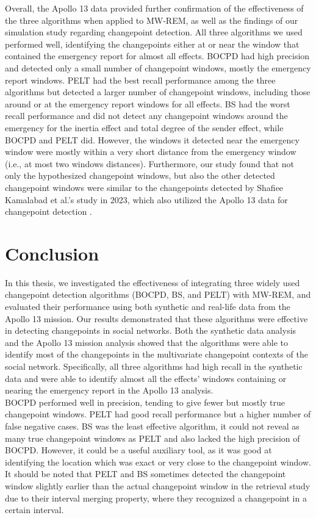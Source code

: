 \documentclass[]{interact}
\theoremstyle{plain}%
\theoremstyle{definition}
\theoremstyle{remark}
\begin{document}
	Overall, the Apollo 13 data provided further confirmation of the effectiveness of the three algorithms when applied to MW-REM, as well as the findings of our simulation study regarding changepoint detection. All three algorithms we used performed well, identifying the changepoints either at or near the window that contained the emergency report for almost all effects. BOCPD had high precision and detected only a small number of changepoint windows, mostly the emergency report windows. PELT had the best recall performance among the three algorithms but detected a larger number of changepoint windows, including those around or at the emergency report windows for all effects. BS had the worst recall performance and did not detect any changepoint windows around the emergency for the inertia effect and total degree of the sender effect, while BOCPD and PELT did. However, the windows it detected near the emergency window were mostly within a very short distance from the emergency window (i.e., at most two windows distances). Furthermore, our study found that not only the hypothesized changepoint windows, but also the other detected changepoint windows were similar to the changepoints detected by Shafiee Kamalabad et al.'s study in 2023, which also utilized the Apollo 13 data for changepoint detection \cite{shafieekamalabadWhatPointChange2023}.
	
	\section{\fontsize{14}{15}\selectfont Conclusion} \label{sec:conclusion}
	
	\hspace{0.28cm} In this thesis, we investigated the effectiveness of integrating three widely used changepoint detection algorithms (BOCPD, BS, and PELT) with MW-REM, and evaluated their performance using both synthetic and real-life data from the Apollo 13 mission. Our results demonstrated that these algorithms were effective in detecting changepoints in social networks. Both the synthetic data analysis and the Apollo 13 mission analysis showed that the algorithms were able to identify most of the changepoints in the multivariate changepoint contexts of the social network. Specifically, all three algorithms had high recall in the synthetic data and were able to identify almost all the effects' windows containing or nearing the emergency report in the Apollo 13 analysis. \\
	
	BOCPD performed well in precision, tending to give fewer but mostly true changepoint windows. PELT had good recall performance but a higher number of false negative cases. BS was the least effective algorithm, it could not reveal as many true changepoint windows as PELT and also lacked the high precision of BOCPD. However, it could be a useful auxiliary tool, as it was good at identifying the location which was exact or very close to the changepoint window. It should be noted that PELT and BS sometimes detected the changepoint window slightly earlier than the actual changepoint window in the retrieval study due to their interval merging property, where they recognized a changepoint in a certain interval. \\
	
\end{document}
